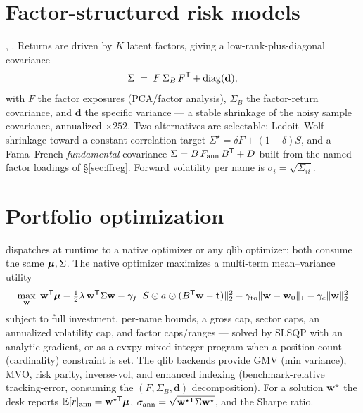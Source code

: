 \documentclass[11pt]{article}
\begin{document}
\section{Factor-structured risk models}
\label{sec:risk}
, . Returns are driven by
$K$ latent factors, giving a low-rank-plus-diagonal covariance
\begin{equation}
  \Sigma \;=\; F\,\Sigma_B\,F^{\mathsf{T}}+\operatorname{diag}(\mathbf d),
\end{equation}
with $F$ the factor exposures (PCA/factor analysis), $\Sigma_B$ the factor-return
covariance, and $\mathbf d$ the specific variance --- a stable shrinkage of the
noisy sample covariance, annualized $\times252$. Two alternatives are selectable:
Ledoit--Wolf shrinkage toward a constant-correlation target
$\Sigma^\star=\delta F+(1-\delta)S$, and a Fama--French \emph{fundamental}
covariance $\Sigma=B\,F_{\text{ann}}\,B^{\mathsf{T}}+D$ built from the named-factor loadings
of \S\ref{sec:ffreg}. Forward volatility per name is $\sigma_i=\sqrt{\Sigma_{ii}}$.

\section{Portfolio optimization}
\label{sec:opt}
 dispatches at runtime to a native optimizer or
any qlib optimizer; both consume the same $\boldsymbol{\mu},\Sigma$. The native optimizer
maximizes a multi-term mean--variance utility
\begin{equation}
  \max_{\mathbf{w}}\;\mathbf{w}^{\mathsf{T}}\boldsymbol{\mu}-\tfrac12\lambda\,\mathbf{w}^{\mathsf{T}}\Sigma\mathbf{w}
  -\gamma_f\lVert S\odot a\odot(B^{\mathsf{T}}\mathbf{w}-\mathbf t)\rVert_2^2
  -\gamma_{\text{to}}\lVert\mathbf{w}-\mathbf{w}_0\rVert_1-\gamma_c\lVert\mathbf{w}\rVert_2^2
\end{equation}
subject to full investment, per-name bounds, a gross cap, sector caps, an
annualized volatility cap, and factor caps/ranges --- solved by SLSQP with an
analytic gradient, or as a cvxpy mixed-integer program when a position-count
(cardinality) constraint is set. The qlib backends provide GMV (min variance), MVO,
risk parity, inverse-vol, and enhanced indexing (benchmark-relative tracking-error,
consuming the $(F,\Sigma_B,\mathbf d)$ decomposition). For a solution $\mathbf{w}^\star$ the
desk reports $\mathbb{E}[r]_{\text{ann}}=\mathbf{w}^{\star\mathsf T}\boldsymbol{\mu}$,
$\sigma_{\text{ann}}=\sqrt{\mathbf{w}^{\star\mathsf T}\Sigma\mathbf{w}^\star}$, and the Sharpe ratio.
\end{document}
